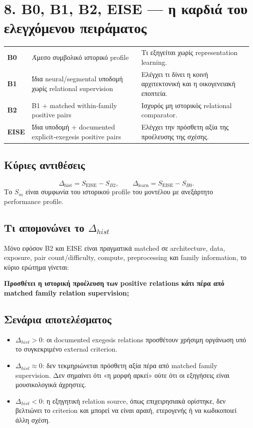 \documentclass[9pt,a4paper]{extarticle}
\begin{document}
\newpage
\section*{8. B0, B1, B2, EISE — η καρδιά του ελεγχόμενου πειράματος}

\begin{tabularx}{\linewidth}{>{\bfseries}p{1.25cm}p{4.2cm}X}
B0 & Άμεσο συμβολικό ιστορικό profile & Τι εξηγείται χωρίς representation learning.\\
B1 & Ίδια neural/segmental υποδομή χωρίς relational supervision & Ελέγχει τι δίνει η κοινή αρχιτεκτονική και η οικογενειακή εποπτεία.\\
B2 & B1 + matched within-family positive pairs & Ισχυρός μη ιστορικός relational comparator.\\
EISE & Ίδια υποδομή + documented explicit-exegesis positive pairs & Ελέγχει την πρόσθετη αξία της προέλευσης της σχέσης.\\
\end{tabularx}

\subsection*{Κύριες αντιθέσεις}
\[
\Delta_{\mathrm{hist}}=S_{\mathrm{EISE}}-S_{B2},
\qquad
\Delta_{\mathrm{learn}}=S_{\mathrm{EISE}}-S_{B0}.
\]
Το \(S_m\) είναι συμφωνία του ιστορικού profile του μοντέλου με ανεξάρτητο performance profile.

\subsection*{Τι απομονώνει το \(\Delta_{hist}\)}
Μόνο εφόσον B2 και EISE είναι πραγματικά matched σε architecture, data, exposure, pair count/difficulty, compute, preprocessing και family information, το κύριο ερώτημα γίνεται:

\begin{center}
\textbf{Προσθέτει η ιστορική προέλευση των positive relations κάτι πέρα από matched family relation supervision;}
\end{center}

\subsection*{Σενάρια αποτελέσματος}
\begin{itemize}
\item \(\Delta_{hist}>0\): οι documented exegesis relations προσθέτουν χρήσιμη οργάνωση υπό το συγκεκριμένο external criterion.
\item \(\Delta_{hist}\approx0\): δεν τεκμηριώνεται πρόσθετη αξία πέρα από matched family supervision. Δεν σημαίνει ότι «η μορφή αρκεί» ούτε ότι οι εξηγήσεις είναι μουσικολογικά άχρηστες.
\item \(\Delta_{hist}<0\): η εξηγητική relation source, όπως επιχειρησιακά ορίστηκε, δεν βελτιώνει το criterion και μπορεί να είναι αραιή, ετερογενής ή να κωδικοποιεί άλλη σχέση.
\end{itemize}
\end{document}
